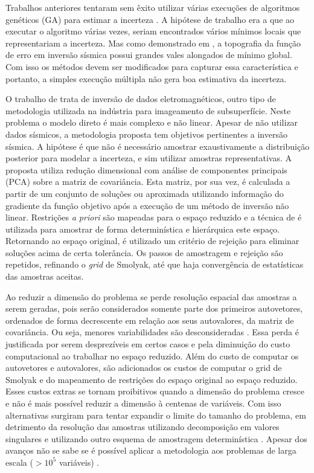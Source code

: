 Trabalhos anteriores tentaram sem êxito utilizar várias execuções de algoritmos
genéticos (GA) para estimar a incerteza \citep[p. 152]{Sen1995v}. A hipótese de
trabalho era a que ao executar o algoritmo várias vezes, seriam encontrados
vários mínimos locais que representariam a incerteza. Mas como demonstrado em
\cite{Martinez2011Topogra}, a topografia da função de erro em inversão sísmica
possui grandes vales alongados de mínimo global. Com isso os métodos devem ser
modificados para capturar essa característica e portanto, a simples execução
múltipla não gera boa estimativa da incerteza.

O trabalho de \cite{TompkinsScalabUnce2011} trata de inversão de dados
eletromagnéticos, outro tipo de metodologia utilizada na indústria para
imageamento de subsuperfície. Neste problema o modelo direto é mais complexo e
não linear. Apesar de não utilizar dados sísmicos, a metodologia proposta tem
objetivos pertinentes a inversão sísmica. A hipótese é que não é necessário
amostrar exaustivamente a distribuição posterior para modelar a incerteza, e sim
utilizar amostras representativas. A proposta utiliza redução dimensional
com análise de componentes principais (PCA) sobre a matriz de covariância.
Esta matriz, por sua vez, é calculada a partir de um conjunto de soluções ou
aproximada utilizando informação do gradiente da função objetivo após a execução
de um método de inversão não linear. Restrições \textit{a priori} são mapeadas
para o espaço reduzido e a técnica de \cite{smolyak63quadrature} é utilizada para
amostrar de forma determinística e hierárquica este espaço. Retornando ao espaço
original, é utilizado um critério de rejeição para eliminar soluções acima de
certa tolerância. Os passos de amostragem e rejeição são repetidos, refinando o
\textit{grid} de Smolyak, até que haja convergência de estatísticas das amostras
aceitas.

Ao reduzir a dimensão do problema se perde resolução espacial das amostras a
serem geradas, pois serão considerados somente parte dos primeiros autovetores,
ordenados de forma decrescente em relação aos seus autovalores, da matriz de
covariância. Ou seja, menores variabilidades são desconsideradas \citep[p.
3]{jolliffe2002principal}. Essa perda é justificada por serem desprezíveis em
certos casos e pela diminuição do custo computacional ao trabalhar no espaço
reduzido. Além do custo de computar os autovetores e autovalores, são
adicionados os custos de computar o grid de Smolyak e do mapeamento de
restrições do espaço original ao espaço reduzido. Esses custos extras se tornam
proibitivos quando a dimensão do problema cresce e não é mais possível reduzir a
dimensão à centenas de variáveis. Com isso alternativas surgiram para tentar
expandir o limite do tamanho do problema, em detrimento da resolução das
amostras utilizando decomposição em valores singulares
\citep{TompkinsScalabUnce2011} e utilizando outro esquema de amostragem
determinística \citep{TompkinsCupature}. Apesar dos avanços não se sabe se é
possível aplicar a metodologia aos problemas de larga escala ($>10^5$ variáveis)
\citep{tompkins_comparisonBayes}.



